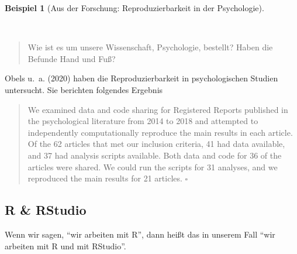 \documentclass[
  a4paper,
  DIV=11]{scrreprt}
\theoremstyle{definition}
\theoremstyle{definition}
\newtheorem{example}{Beispiel}[chapter]
\theoremstyle{definition}
\theoremstyle{remark}
\begin{document}
\begin{example}[Aus der Forschung: Reproduzierbarkeit in der
Psychologie]\protect\hypertarget{exm-repro}{}\label{exm-repro}

~

\begin{quote}
{} Wie ist es um unsere Wissenschaft, Psychologie,
bestellt? Haben die Befunde Hand und Fuß?
\end{quote}

Obels u.~a. (2020) haben die Reproduzierbarkeit in psychologischen
Studien untersucht. Sie berichten folgendes Ergebnis

\begin{quote}
We examined data and code sharing for Registered Reports published in
the psychological literature from 2014 to 2018 and attempted to
independently computationally reproduce the main results in each
article. Of the 62 articles that met our inclusion criteria, 41 had data
available, and 37 had analysis scripts available. Both data and code for
36 of the articles were shared. We could run the scripts for 31
analyses, and we reproduced the main results for 21 articles.
\(\square\)
\end{quote}

\end{example}

\subsection{R \& RStudio}\label{r-rstudio}

Wenn wir sagen, ``wir arbeiten mit R'', dann heißt das in unserem Fall
``wir arbeiten mit R und mit RStudio''.
\end{document}

